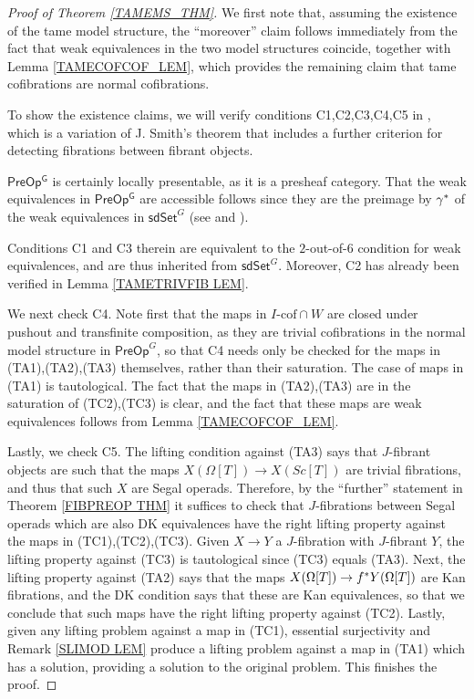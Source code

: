 \documentclass[a4paper,10pt]{article}%
\numberwithin{equation}{section}
\numberwithin{figure}{section}
\theoremstyle{definition} %
\newcommand{\1}{\ensuremath{\mathbbm 1}}%
\begin{document}
\begin{proof}[Proof of Theorem \ref{TAMEMS_THM}]
	We first note that, assuming the existence of the tame model structure,
	the ``moreover'' claim
	follows immediately from the fact that weak equivalences in the two model structures coincide, together with  
	Lemma \ref{TAMECOFCOF_LEM},
	which provides the remaining claim that tame cofibrations are normal cofibrations.
	
	To show the existence claims, we will verify conditions C1,C2,C3,C4,C5 in 
	\cite[Prop. 2.3]{Sta14},
	which is a variation of 
	J. Smith's theorem \cite[Thm. 1.7]{Bek00}
	that includes a further criterion for detecting 
	fibrations between fibrant objects.

	$\mathsf{PreOp^G}$ is certainly locally presentable, 
	as it is a presheaf category.
	That the weak equivalences in $\mathsf{PreOp^G}$ are accessible follows since they are the preimage by $\gamma^{\**}$ of the weak equivalences in 
	$\mathsf{sdSet}^G$ 
	(see \cite[Cor. A.2.6.5]{Lur09} and \cite[Cor. A.2.6.6]{Lur09}).
	
	Conditions C1 and C3 therein are equivalent to the $2$-out-of-$6$
	condition for weak equivalences, and are thus inherited 
	from $\mathsf{sdSet}^G$.
	Moreover, C2 has already been verified in Lemma \ref{TAMETRIVFIB LEM}. 

We next check C4. 
Note first that the maps in $I\text{-cof} \cap W$
are closed under pushout and transfinite composition, as they are trivial cofibrations in the normal model structure in 
$\mathsf{PreOp}^G$,
so that C4 needs only be checked for the maps in (TA1),(TA2),(TA3) themselves, rather than their saturation.
The case of maps in (TA1) is tautological.
The fact that the maps in 
(TA2),(TA3) are in the saturation of (TC2),(TC3) is clear, and the fact that these maps are weak equivalences follows from 
Lemma \ref{TAMECOFCOF_LEM}.

	
Lastly, we check C5.
The lifting condition against (TA3) says that $J$-fibrant objects are such that the maps $X(\Omega[T]) \to X(Sc[T])$
are trivial fibrations, and thus that such $X$ are Segal operads.
Therefore, by the ``further'' statement in
Theorem \ref{FIBPREOP THM} 
it suffices to check that $J$-fibrations between Segal operads which are also DK equivalences have the right lifting property against the maps in (TC1),(TC2),(TC3).
Given $X \to Y$ a $J$-fibration with $J$-fibrant $Y$,
the lifting property against (TC3) is tautological since 
(TC3) equals (TA3).
Next, the lifting property against (TA2) says that the maps
$X(\Omega[T]) \to f^{\**} Y(\Omega[T])$
are Kan fibrations, and the DK condition says that these are Kan equivalences,
so that we conclude that such maps have the right lifting property against (TC2).
Lastly, given any lifting problem against a map in (TC1),
essential surjectivity and Remark \ref{SLIMOD LEM}
produce a lifting problem against a map in (TA1) which has a solution, providing a solution to the original problem.
%
This finishes the proof.	
\end{proof}
\end{document}
